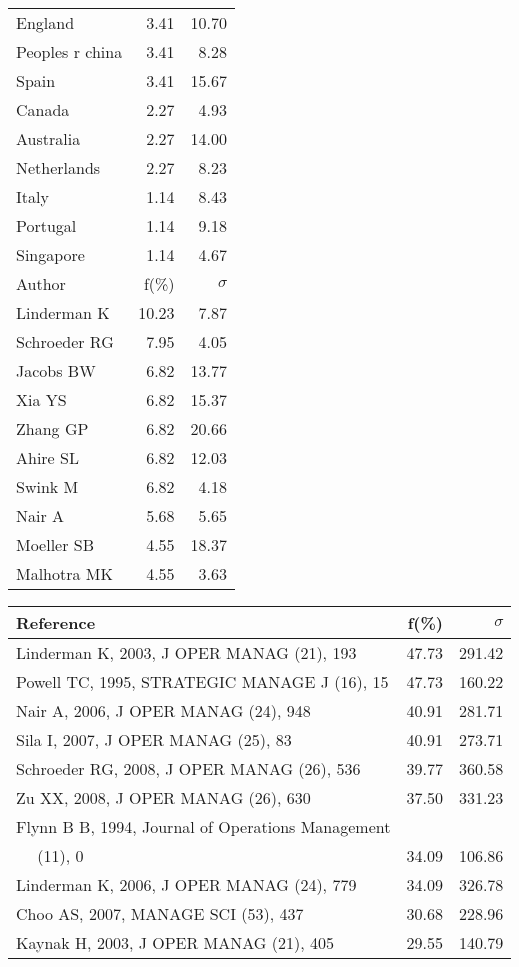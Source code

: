 \documentclass[a4paper,11pt]{report}
\begin{document}
\begin{landscape}
\begin{table}[!ht]
{\begin{tabular}{|l r r|}
England & 3.41 & 10.70\\
Peoples r china & 3.41 & 8.28\\
Spain & 3.41 & 15.67\\
Canada & 2.27 & 4.93\\
Australia & 2.27 & 14.00\\
Netherlands & 2.27 & 8.23\\
Italy & 1.14 & 8.43\\
Portugal & 1.14 & 9.18\\
Singapore & 1.14 & 4.67\\
\hline
\hline
Author & f(\%) & $\sigma$\\
\hline
Linderman K & 10.23 & 7.87\\
Schroeder RG & 7.95 & 4.05\\
Jacobs BW & 6.82 & 13.77\\
Xia YS & 6.82 & 15.37\\
Zhang GP & 6.82 & 20.66\\
Ahire SL & 6.82 & 12.03\\
Swink M & 6.82 & 4.18\\
Nair A & 5.68 & 5.65\\
Moeller SB & 4.55 & 18.37\\
Malhotra MK & 4.55 & 3.63\\
\hline
\end{tabular}
}
{\scriptsize\begin{tabular}{|l r r|}
\hline
Reference & f(\%) & $\sigma$\\
\hline
Linderman K, 2003, J OPER MANAG (21), 193 & 47.73 & 291.42\\
Powell TC, 1995, STRATEGIC MANAGE J (16), 15 & 47.73 & 160.22\\
Nair A, 2006, J OPER MANAG (24), 948 & 40.91 & 281.71\\
Sila I, 2007, J OPER MANAG (25), 83 & 40.91 & 273.71\\
Schroeder RG, 2008, J OPER MANAG (26), 536 & 39.77 & 360.58\\
Zu XX, 2008, J OPER MANAG (26), 630 & 37.50 & 331.23\\
Flynn B B, 1994, Journal of Operations Management &  & \\
$\quad$ (11), 0 & 34.09 & 106.86\\
Linderman K, 2006, J OPER MANAG (24), 779 & 34.09 & 326.78\\
Choo AS, 2007, MANAGE SCI (53), 437 & 30.68 & 228.96\\
Kaynak H, 2003, J OPER MANAG (21), 405 & 29.55 & 140.79\\

\end{tabular}}
\end{table}
\end{landscape}
\end{document}
